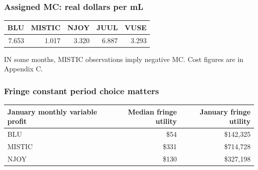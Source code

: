 \documentclass[11pt,]{article}
\begin{document}
\subsubsection{Assigned MC: real dollars per
mL}\label{assigned-mc-real-dollars-per-ml}

\begin{longtable}[]{@{}rrrrr@{}}
\toprule
BLU & MISTIC & NJOY & JUUL & VUSE\tabularnewline
\midrule
\endhead
7.653 & 1.017 & 3.320 & 6.887 & 3.293\tabularnewline
\bottomrule
\end{longtable}

IN some months, MISTIC observations imply negative MC. Cost figures are
in Appendix C.

\subsubsection{Fringe constant period choice
matters}\label{fringe-constant-period-choice-matters}

\begin{longtable}[]{@{}lrr@{}}
\toprule
\begin{minipage}[b]{0.38\columnwidth}\raggedright\strut
January monthly variable profit\strut
\end{minipage} & \begin{minipage}[b]{0.27\columnwidth}\raggedleft\strut
Median fringe utility\strut
\end{minipage} & \begin{minipage}[b]{0.27\columnwidth}\raggedleft\strut
January fringe utility\strut
\end{minipage}\tabularnewline
\midrule
\endhead
\begin{minipage}[t]{0.38\columnwidth}\raggedright\strut
BLU\strut
\end{minipage} & \begin{minipage}[t]{0.27\columnwidth}\raggedleft\strut
\$54\strut
\end{minipage} & \begin{minipage}[t]{0.27\columnwidth}\raggedleft\strut
\$142,325\strut
\end{minipage}\tabularnewline
\begin{minipage}[t]{0.38\columnwidth}\raggedright\strut
MISTIC\strut
\end{minipage} & \begin{minipage}[t]{0.27\columnwidth}\raggedleft\strut
\$331\strut
\end{minipage} & \begin{minipage}[t]{0.27\columnwidth}\raggedleft\strut
\$714,728\strut
\end{minipage}\tabularnewline
\begin{minipage}[t]{0.38\columnwidth}\raggedright\strut
NJOY\strut
\end{minipage} & \begin{minipage}[t]{0.27\columnwidth}\raggedleft\strut
\$130\strut
\end{minipage} & \begin{minipage}[t]{0.27\columnwidth}\raggedleft\strut
\$327,198\strut
\end{minipage}\tabularnewline
\bottomrule
\end{longtable}
\end{document}
